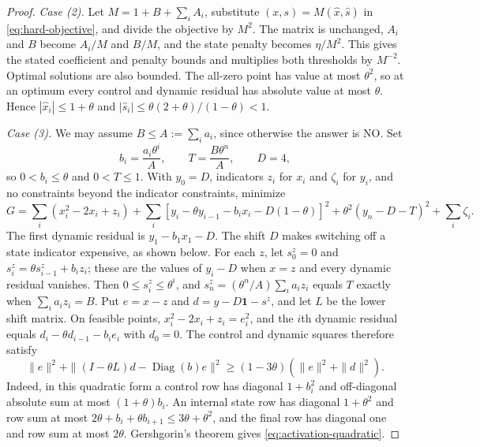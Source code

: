 \begin{proof}
\emph{Case (2).} Let $M=1+B+\sum_iA_i$, substitute
$(x,s)=M(\widehat x,\widehat s)$ in \eqref{eq:hard-objective}, and
divide the objective by $M^2$. The matrix is unchanged, $A_i$ and $B$
become $A_i/M$ and $B/M$, and the state penalty becomes $\eta/M^2$. This
gives the stated coefficient and penalty bounds and multiplies both
thresholds by $M^{-2}$. Optimal solutions are also bounded. The all-zero
point has value at most $\theta^2$, so at an optimum every control and
dynamic residual has absolute value at most $\theta$. Hence
$|\widehat x_i|\le1+\theta$ and
$|\widehat s_i|\le\theta(2+\theta)/(1-\theta)<1$.

\emph{Case (3).} We may assume $B\le A:=\sum_i a_i$, since otherwise the
answer is NO. Set
\[
 b_i=\frac{a_i\theta^i}{A},\qquad
 T=\frac{B\theta^n}{A},\qquad D=4,
\]
so $0<b_i\le\theta$ and $0<T\le1$. With $y_0=D$, indicators $z_i$ for
$x_i$ and $\zeta_i$ for $y_i$, and no constraints beyond the indicator
constraints, minimize
\begin{equation}\label{eq:unit-hard}
 G=\sum_i(x_i^2-2x_i+z_i)
 +\sum_i[y_i-\theta y_{i-1}-b_i x_i-D(1-\theta)]^2
 +\theta^2(y_n-D-T)^2+\sum_i\zeta_i.
\end{equation}
The first dynamic residual is $y_1-b_1x_1-D$. The shift $D$ makes
switching off a state indicator expensive, as shown below.
For each $z$, let $s_0^z=0$ and $s_i^z=\theta s_{i-1}^z+b_i z_i$; these
are the values of $y_i-D$ when $x=z$ and every dynamic residual
vanishes. Then $0\le s_i^z\le\theta^i$, and
$s_n^z=(\theta^n/A)\sum_ia_iz_i$ equals $T$ exactly when
$\sum_i a_i z_i=B$.
Put $e=x-z$ and $d=y-D\mathbf1-s^z$, and let $L$ be the lower shift
matrix. On feasible points, $x_i^2-2x_i+z_i=e_i^2$, and the $i$th
dynamic residual equals $d_i-\theta d_{i-1}-b_ie_i$ with $d_0=0$. The
control and dynamic squares therefore satisfy
\begin{equation}\label{eq:activation-quadratic}
 \|e\|^2+\|(I-\theta L)d-\operatorname{Diag}(b)e\|^2
 \ge(1-3\theta)(\|e\|^2+\|d\|^2).
\end{equation}
Indeed, in this quadratic form a control row has diagonal $1+b_i^2$
and off-diagonal absolute sum at most $(1+\theta)b_i$.
An internal state row has diagonal $1+\theta^2$ and row sum at most
$2\theta+b_i+\theta b_{i+1}\le3\theta+\theta^2$, and
the final row has diagonal one and row sum at most $2\theta$.
Gershgorin's theorem gives \eqref{eq:activation-quadratic}.


\end{proof}

